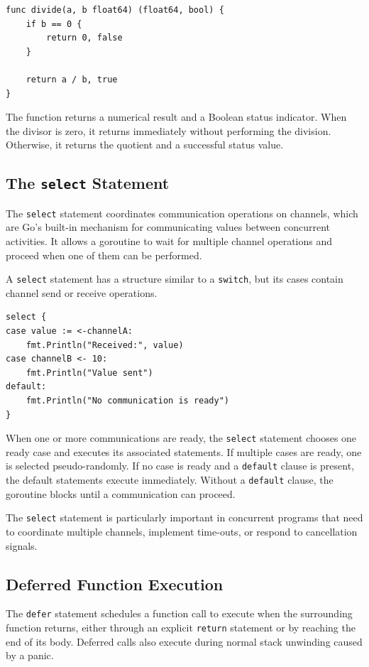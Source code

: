 \begin{lstlisting}
func divide(a, b float64) (float64, bool) {
    if b == 0 {
        return 0, false
    }

    return a / b, true
}
\end{lstlisting}

The function returns a numerical result and a Boolean
status indicator. When the divisor is zero, it returns
immediately without performing the division. Otherwise,
it returns the quotient and a successful status value.

\subsection{The \texttt{select} Statement}

The \texttt{select} statement coordinates communication
operations on channels, which are Go's built-in mechanism
for communicating values between concurrent activities.
It allows a goroutine to wait for multiple channel
operations and proceed when one of them can be performed.

A \texttt{select} statement has a structure similar to
a \texttt{switch}, but its cases contain channel send or
receive operations.

\begin{lstlisting}
select {
case value := <-channelA:
    fmt.Println("Received:", value)
case channelB <- 10:
    fmt.Println("Value sent")
default:
    fmt.Println("No communication is ready")
}
\end{lstlisting}

When one or more communications are ready, the
\texttt{select} statement chooses one ready case and
executes its associated statements. If multiple cases
are ready, one is selected pseudo-randomly. If no case
is ready and a \texttt{default} clause is present, the
default statements execute immediately. Without a
\texttt{default} clause, the goroutine blocks until a
communication can proceed.

The \texttt{select} statement is particularly important
in concurrent programs that need to coordinate multiple
channels, implement time-outs, or respond to cancellation
signals.

\subsection{Deferred Function Execution}

The \texttt{defer} statement schedules a function call
to execute when the surrounding function returns, either
through an explicit \texttt{return} statement or by
reaching the end of its body. Deferred calls also execute
during normal stack unwinding caused by a panic.


